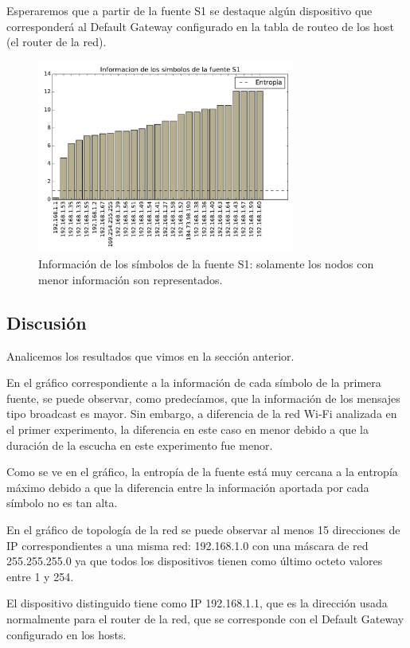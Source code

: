 Esperaremos que a partir de la fuente S1 se destaque algún dispositivo que corresponderá al Default Gateway configurado en la tabla de routeo de los host (el router de la red).

\begin{figure}[H]
  \centering
  \includegraphics[width=8.5cm]{exp_empresa/grafico3.pdf}
  \caption{ \normalfont Información de los símbolos de la fuente S1: solamente los nodos con menor información son representados.}
\end{figure}

\subsection{Discusión}

Analicemos los resultados que vimos en la sección anterior.

En el gráfico correspondiente a la información de cada símbolo de la primera fuente, se puede observar, como predecíamos, que la información de los mensajes tipo broadcast es mayor. Sin embargo, a diferencia de la red Wi-Fi analizada en el primer experimento, la diferencia en este caso en menor debido a que la duración de la escucha en este experimento fue menor.

Como se ve en el gráfico, la entropía de la fuente está muy cercana a la entropía máximo debido a que la diferencia entre la información aportada por cada símbolo no es tan alta.

En el gráfico de topología de la red se puede observar al menos 15 direcciones de IP correspondientes a una misma red: 192.168.1.0 con una máscara de red 255.255.255.0 ya que todos los dispositivos tienen como último octeto valores entre 1 y 254. 

El dispositivo distinguido tiene como IP 192.168.1.1, que es la dirección usada normalmente para el router de la red, que se corresponde con el Default Gateway configurado en los hosts.

